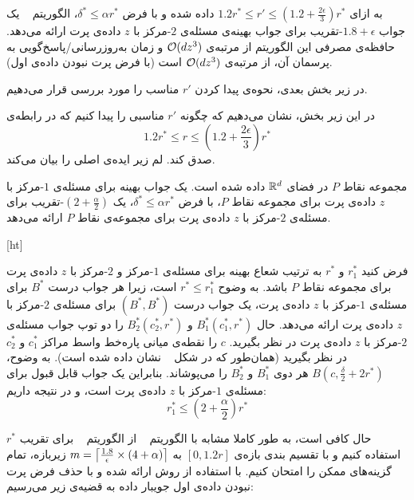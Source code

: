 
به ازای $1.2r^* \leq r' \leq (1.2 + \frac{2\epsilon}{3})r^*$ داده شده و با فرض $\delta^* \leq \alpha r^*$، الگوریتم ~ یک جواب $1.8 + \epsilon$-تقریب برای جواب بهینه‌ی مسئله‌ی $2$-مرکز با $z$ داده‌ی پرت ارائه می‌دهد. حافظه‌ی مصرفی این الگوریتم از مرتبه‌ی $\mathcal{O}(dz^3)$ و زمان به‌رو‌زرسانی/پاسخ‌گویی به پرسمان آن، از مرتبه‌ی $\mathcal{O}(dz^3)$ است (با فرض پرت نبودن داده‌ی اول).


در زیر بخش بعدی، نحوه‌ی پیدا کردن $r'$ مناسب را مورد بررسی قرار می‌دهیم.


در این زیر بخش، نشان می‌دهیم که چگونه $r'$ مناسبی را پیدا کنیم که در رابطه‌ی 
$$1.2r^* \leq r \leq (1.2 + \frac{2\epsilon}{3})r^*$$
صدق کند. لم زیر ایده‌ی اصلی را بیان می‌کند.

مجموعه نقاط $P$ در فضای $\mathbb{R}^d$ داده شده است. یک جواب بهینه برای مسئله‌ی $1$-مرکز با $z$ داده‌ی پرت برای مجموعه نقاط $P$، با فرض $\delta^* \leq \alpha r^*$، یک $(2 + \frac{\alpha}{2})$-تقریب برای مسئله‌ی $2$-مرکز با $z$ داده‌ی پرت برای مجموعه‌ی نقاط $P$ ارائه می‌دهد.

[ht]


فرض کنید $r_1^*$ و $r^*$ به ترتیب شعاع بهینه برای مسئله‌ی $1$-مرکز و $2$-مرکز با $z$ داده‌ی پرت برای مجموعه نقاط $P$ باشد. به وضوح $r^* \leq r_1^*$ است، زیرا هر جواب درست $B^*$ برای مسئله‌ی $1$-مرکز با $z$ داده‌ی پرت، یک جواب درست $(B^*, B^*)$ برای مسئله‌‌ی $2$-مرکز با $z$ داده‌ی پرت ارائه می‌دهد. حال $B_1^*(c_1^*, r^*)$ و $B_2^*(c_2^*, r^*)$ را دو توپ جواب مسئله‌ی $2$-مرکز با $z$ داده‌ی پرت در نظر بگیرید.  $c$ را نقطه‌ی میانی پاره‌خط واسط مراکز $c_1^*$ و $c_2^*$ در نظر بگیرید (همان‌طور که در شکل ~ نشان داده شده است). به وضوح، $B(c, \frac{\delta}{2} + 2r^*)$ هر دوی $B_1^*$ و $B_2^*$ را می‌پوشاند. بنابراین یک جواب قابل قبول برای مسئله‌ی $1$-مرکز با $z$ داده‌ی پرت است، و در نتیجه داریم:
$$r_1^* \leq (2 + \frac{\alpha}{2})r^*$$ 



حال کافی است، به طور کاملا مشابه با الگوریتم ~ از‌ الگوریتم ~ برای تقریب $r^*$ استفاده کنیم و با تقسیم بندی بازه‌ی $[0, 1.2r]$ به $m = \left\lceil{\frac{1.8}{\epsilon} \times (4 + \alpha)}\right\rceil$ زیربازه، تمام گزینه‌های ممکن را امتحان کنیم. با استفاده از روش ارائه شده و با حذف فرض پرت نبودن داده‌ی اول جویبار داده به قضیه‌ی زیر می‌رسیم:

